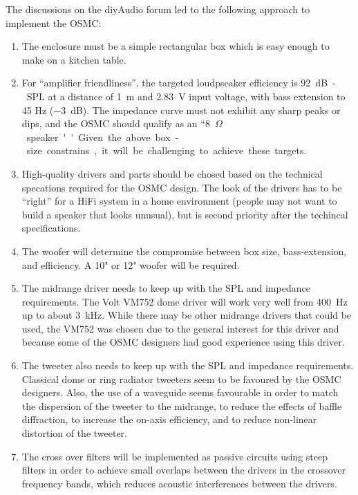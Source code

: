 \documentclass[12pt,a4paper]{article}
\begin{document}
\clearpage

The discussions on the diyAudio forum led to the following approach to implement the OSMC:
\begin{enumerate}

\item The enclosure must be a simple rectangular box which is easy enough to make on a kitchen table.

\item For ``amplifier friendliness'', the targeted loudpseaker efficiency is \SI{92}{dB-SPL} at a distance of \SI{1}{m} and \SI{2.83}{V} input voltage, with bass extension to 45 Hz (\SI{-3}{dB}). The impedance curve must not exhibit any sharp peaks or dips, and the OSMC should qualify as an ``\SI{8}{$\Omega$} speaker''. Given the above box-size constrains, it will be challenging to achieve these targets.

\item High-quality drivers and parts should be chosed based on the technical specations required for the OSMC design. The look of the drivers has to be ``right'' for a HiFi system in a home environment (people may not want to build a speaker that looks unusual), but is second priority after the techincal specifications.

\item The woofer will determine the compromise between box size, bass-extension, and efficiency. A 10" or 12" woofer will be required.

\item The midrange driver needs to keep up with the SPL and impedance requirements. The Volt VM752 dome driver will work very well from \SI{400}{Hz} up to about \SI{3}{kHz}. While there may be other midrange drivers that could be used, the VM752 was chosen due to the general interest for this driver and because some of the OSMC designers had good experience using this driver.

\item The tweeter also needs to keep up with the SPL and impedance requirements. Classical dome or ring radiator tweeters seem to be favoured by the OSMC designers. Also, the use of a waveguide seems favourable in order to match the dispersion of the tweeter to the midrange, to reduce the effects of baffle diffraction, to increase the on-axis efficiency, and to reduce non-linear distortion of the tweeter.

\item The cross over filters will be implemented as passive circuits using steep filters in order to achieve small overlaps between the drivers in the crossover frequency bands, which reduces acoustic interferences between the drivers.

\end{enumerate}
\end{document}
